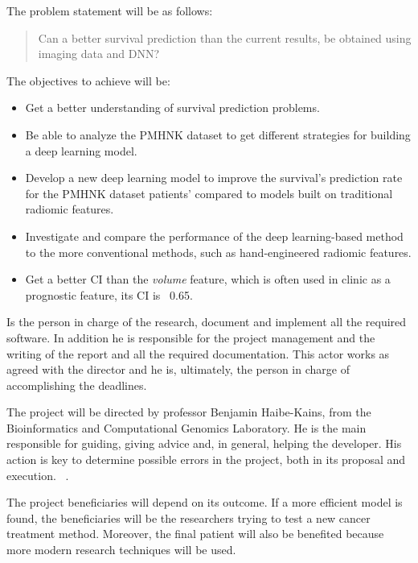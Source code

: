 The problem statement will be as follows:
\begin{quotation}
  Can a better survival prediction than the current results, be obtained using imaging data and
  \gls{DNN}?
\end{quotation}


The objectives to achieve will be:
\begin{itemize}
  \item Get a better understanding of survival prediction problems.
  \item Be able to analyze the \gls{PMHNK} dataset to get different strategies for building a 
  deep learning model.
  \item Develop a new deep learning model to improve the survival's prediction rate for the
  \gls{PMHNK} dataset patients' compared to models built on traditional radiomic features.
  \item Investigate and compare the performance of the deep learning-based method to 
  the more conventional methods, such as hand-engineered radiomic features.
  \item Get a better \gls{CI} than the \emph{volume} feature, which is often used in clinic as a
  prognostic feature, its \gls{CI} is ~0.65.
\end{itemize}


Is the person in charge of the research, document and implement all the required software.
In addition he is responsible for the project management and the writing of the report
and all the required documentation. This actor works as agreed with the director and
he is, ultimately, the person in charge of accomplishing the deadlines.

The project will be directed by professor Benjamin Haibe-Kains, from the Bioinformatics 
and Computational Genomics Laboratory. He is the main responsible for guiding, giving 
advice and, in general, helping the developer.
His action is key to determine possible errors in the project, both in its proposal and 
execution.
~\cites{bhklab}.

The project beneficiaries will depend on its outcome. If a more efficient model is found, the
beneficiaries will be the researchers trying to test a new cancer treatment method. Moreover,
the final patient will also be benefited because more modern research techniques will be used.

